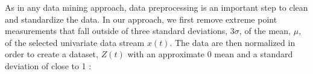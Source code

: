 As in any data mining approach, data preprocessing is an important step to clean and standardize the data. In our approach, we first remove extreme point measurements that fall outside of three standard deviations, 3$\sigma$, of the mean, $\mu$, of the selected univariate data stream $x(t)$. The data are then normalized in order to create a dataset, $Z(t)$ with an approximate 0 mean and a standard deviation of close to 1 \cite{goldin_similiarity_1995}: